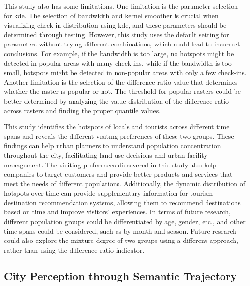 \documentclass{article}
\theoremstyle{remark}
\begin{document}
This study also has some limitations. One limitation is the parameter selection for \acrshort{kde}. The selection of bandwidth and kernel smoother is crucial when visualizing check-in distribution using \acrshort{kde}, and these parameters should be determined through testing. However, this study uses the default setting for parameters without trying different combinations, which could lead to incorrect conclusions. For example, if the bandwidth is too large, no hotspots might be detected in popular areas with many check-ins, while if the bandwidth is too small, hotspots might be detected in non-popular areas with only a few check-ins. Another limitation is the selection of the difference ratio value that determines whether the raster is popular or not. The threshold for popular rasters could be better determined by analyzing the value distribution of the difference ratio across rasters and finding the proper quantile values.

This study identifies the hotspots of locals and tourists across different time spans and reveals the different visiting preferences of these two groups. These findings can help urban planners to understand population concentration throughout the city, facilitating land use decisions and urban facility management. The visiting preferences discovered in this study also help companies to target customers and provide better products and services that meet the needs of different populations. Additionally, the dynamic distribution of hotspots over time can provide supplementary information for tourism destination recommendation systems, allowing them to recommend destinations based on time and improve visitors' experiences. In terms of future research, different population groups could be differentiated by age, gender, etc., and other time spans could be considered, such as by month and season. Future research could also explore the mixture degree of two groups using a different approach, rather than using the difference ratio indicator.


\subsection{City Perception through Semantic Trajectory} \label{discussion_rq2}
\end{document}
